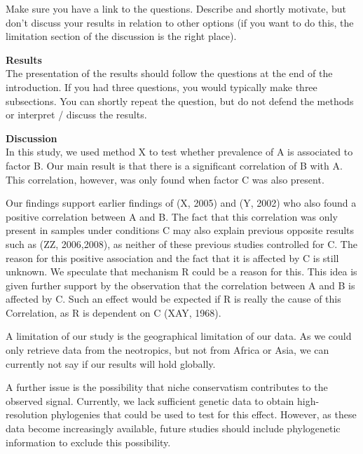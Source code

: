 \documentclass{tufte-book}
\begin{document}
Make sure you have a link to the questions. Describe and shortly motivate, but don't discuss your results in relation to other options (if you want to do this, the limitation section of the discussion is the right place).

\noindent\textbf{Results}\\

The presentation of the results should follow the questions at the end of the introduction. If you had three questions, you would typically make three subsections. You can shortly repeat the question, but do not defend the methods or interpret / discuss the results. 

\noindent\textbf{Discussion}\\
In this study, we used method X to test whether prevalence of A is associated to factor B. Our main result is that there is a significant correlation of B with A. This correlation, however, was only found when factor C was also present.

Our findings support earlier findings of (X, 2005) and (Y, 2002) who also found a positive correlation between A and B. The fact that this correlation was only present in samples under conditions C may also explain previous opposite results such as (ZZ, 2006,2008), as neither of these previous studies controlled for C. The reason for this positive association and the fact that it is affected by C is still unknown. We speculate that mechanism R could be a reason for this. This idea is given further support by the observation that the correlation between A and B is affected by C. Such an effect would be expected if R is really the cause of this Correlation, as R is dependent on C (XAY, 1968).

A limitation of our study is the geographical limitation of our data. As we could only retrieve data from the neotropics, but not from Africa or Asia, we can currently not say if our results will hold globally.

A further issue is the possibility that niche conservatism contributes to the observed signal. Currently, we lack sufficient genetic data to obtain high-resolution phylogenies that could be used to test for this effect. However, as these data become increasingly available, future studies should include phylogenetic information to exclude this possibility. 
\end{document}
